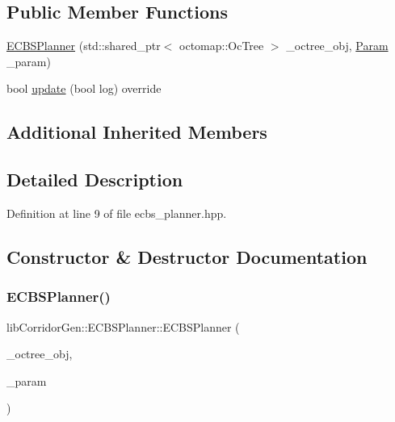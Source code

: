 \subsection*{Public Member Functions}
\begin{DoxyCompactItemize}
\item 
\hyperlink{classlib_corridor_gen_1_1_e_c_b_s_planner_af300eb5080e7979bef2f62d8886f5c85}{E\+C\+B\+S\+Planner} (std\+::shared\+\_\+ptr$<$ octomap\+::\+Oc\+Tree $>$ \+\_\+octree\+\_\+obj, \hyperlink{classlib_corridor_gen_1_1_param}{Param} \+\_\+param)
\item 
bool \hyperlink{classlib_corridor_gen_1_1_e_c_b_s_planner_a0d4c5855c02228c677b3d2d89c10740c}{update} (bool log) override
\end{DoxyCompactItemize}
\subsection*{Additional Inherited Members}


\subsection{Detailed Description}


Definition at line 9 of file ecbs\+\_\+planner.\+hpp.



\subsection{Constructor \& Destructor Documentation}
\mbox{\label{classlib_corridor_gen_1_1_e_c_b_s_planner_af300eb5080e7979bef2f62d8886f5c85}} 
\subsubsection{\texorpdfstring{E\+C\+B\+S\+Planner()}{ECBSPlanner()}}
{\footnotesize\ttfamily lib\+Corridor\+Gen\+::\+E\+C\+B\+S\+Planner\+::\+E\+C\+B\+S\+Planner (\begin{DoxyParamCaption}\item[{std\+::shared\+\_\+ptr$<$ octomap\+::\+Oc\+Tree $>$}]{\+\_\+octree\+\_\+obj,  }\item[{\hyperlink{classlib_corridor_gen_1_1_param}{Param}}]{\+\_\+param }\end{DoxyParamCaption})\hspace{0.3cm}{\ttfamily [inline]}}



